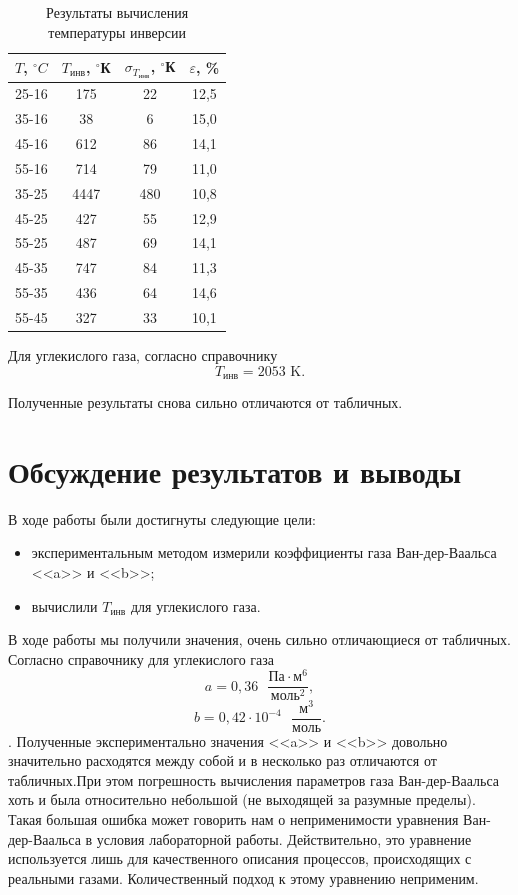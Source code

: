\documentclass[12pt,a4paper]{article}
\begin{document}
\begin{table}[H]
	\centering
	\begin{tabular}{|c|c|c|c|}
		\hline
		$ T $, $ ^\circ C $ & $ T_\text{инв} $, $ ^\circ $К & $ \sigma_{T_\text{инв}} $, $ ^\circ $К & $ \varepsilon $, \% \\ \hline
		25-16 & 175 & 22 & 12,5 \\ \hline
		35-16 & 38 & 6 & 15,0 \\ \hline
		45-16 & 612 & 86 & 14,1 \\ \hline
		55-16 & 714 & 79 & 11,0 \\ \hline
		35-25 & 4447 & 480 & 10,8 \\ \hline
		45-25 & 427 & 55 & 12,9 \\ \hline
		55-25 & 487 & 69 & 14,1 \\ \hline
		45-35 & 747 & 84 & 11,3 \\ \hline
		55-35 & 436 & 64 & 14,6 \\ \hline
		55-45 & 327 & 33 & 10,1 \\ \hline
	\end{tabular}
	\caption{Результаты вычисления температуры инверсии}
	\label{tab:temp}
\end{table}

Для углекислого газа, согласно справочнику  \[ T_\text{инв} = 2053 \text{ K}.\]

Полученные результаты снова сильно отличаются от табличных.

\section{Обсуждение результатов и выводы}

В ходе работы были достигнуты следующие цели:

\begin{itemize}
	\item экспериментальным методом измерили коэффициенты газа Ван-дер-Ваальса <<a>> и <<b>>;
	\item вычислили $ T_\text{инв} $ для углекислого газа.
\end{itemize}

В ходе работы мы получили значения, очень сильно отличающиеся от табличных. Согласно справочнику для углекислого газа \[ a = 0,36 \text{ } \frac{\text{Па}\cdot\text{м}^6}{\text{моль}^2}, \] \[ b = 0,42\cdot 10^{-4} \text{ }\frac{\text{м}^3}{\text{моль}}. \]. Полученные экспериментально значения <<a>> и <<b>> довольно значительно расходятся между собой и в несколько раз отличаются от табличных.При этом погрешность вычисления параметров газа Ван-дер-Ваальса хоть и была относительно небольшой (не выходящей за разумные пределы). Такая большая ошибка может говорить нам о неприменимости уравнения Ван-дер-Ваальса в условия лабораторной работы. Действительно, это уравнение используется лишь для качественного описания процессов, происходящих с реальными газами. Количественный подход к этому уравнению неприменим.
\end{document}
